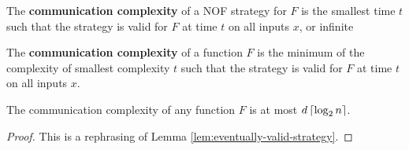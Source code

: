 \begin{definition}
  \label{def:strategy-complexity}

  The {\bf communication complexity} of a NOF strategy for $F$ is the smallest time $t$ such that the strategy is valid for $F$ at time $t$ on all inputs $x$, or infinite
\end{definition}

\begin{definition}
  \label{def:function-complexity}

  The {\bf communication complexity} of a function $F$ is the minimum of the complexity of smallest complexity $t$ such that the strategy is valid for $F$ at time $t$ on all inputs $x$.
\end{definition}

\begin{lemma}
  \label{lem:trivial-bound-function-complexity}

  The communication complexity of any function $F$ is at most $d\left\lceil \log_2 n\right\rceil$.
\end{lemma}
\begin{proof}

  This is a rephrasing of Lemma \ref{lem:eventually-valid-strategy}.
\end{proof}
